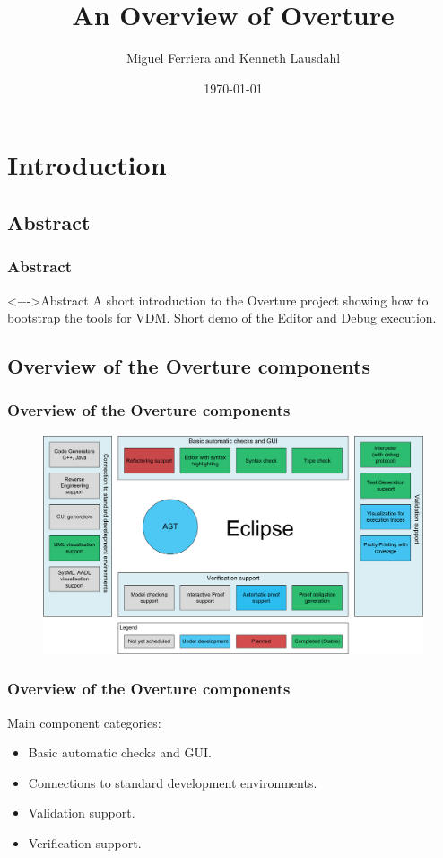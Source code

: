 \documentclass{beamer}
\title{An Overview of Overture}
\author{Miguel Ferriera and Kenneth Lausdahl}
\date{\today}
\begin{document}
\frame{\titlepage}

\section[Outline]{}
\frame{\tableofcontents}

\section{Introduction}
\subsection{Abstract}
\frame
{
  \frametitle{Abstract}

\begin{block}<+->{Abstract}
A short introduction to the Overture project showing how to bootstrap the tools for VDM. Short demo of the Editor and Debug execution.
\end{block}


}


\subsection{Overview of the Overture components}
\frame
{
  \frametitle{Overview of the Overture components}

\begin{figure}[t]
\centering
\includegraphics[width=\textwidth]{images/OvertureOverview}
\label{fig:}
\end{figure}

}

\frame
{
  \frametitle{Overview of the Overture components}
Main component categories:
  \begin{itemize}
  \item<1-> Basic automatic checks and GUI.
  \item<2-> Connections to standard development environments.
  \item<3-> Validation support.      
  \item<4-> Verification support.
  \end{itemize}
}
\end{document}
